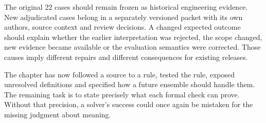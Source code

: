 The original 22 cases should remain frozen as historical engineering evidence.
New adjudicated cases belong in a separately versioned packet with its own
authors, source context and review decisions. A changed expected outcome should
explain whether the earlier interpretation was rejected, the scope changed,
new evidence became available or the evaluation semantics were corrected.
Those causes imply different repairs and different consequences for existing
releases.

The chapter has now followed a source to a rule, tested the rule, exposed
unresolved definitions and specified how a future ensemble should handle them.
The remaining task is to state precisely what each formal check can prove.
Without that precision, a solver's success could once again be mistaken for
the missing judgment about meaning.


